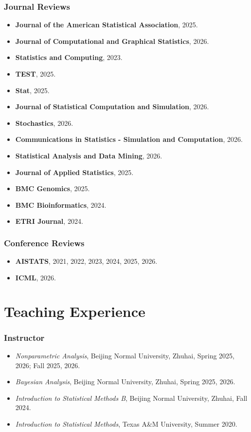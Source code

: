 \documentclass[letterpaper,11pt]{article}
\begin{document}
\subsubsection*{Journal Reviews}
\begin{itemize}[leftmargin=0.15in, label={}]
    \item \textbf{Journal of the American Statistical Association}, 2025.
    \item \textbf{Journal of Computational and Graphical Statistics}, 2026.
    \item \textbf{Statistics and Computing}, 2023.
    \item \textbf{TEST}, 2025.
    \item \textbf{Stat}, 2025.
    \item \textbf{Journal of Statistical Computation and Simulation}, 2026.
    \item \textbf{Stochastics}, 2026.
    \item \textbf{Communications in Statistics - Simulation and Computation}, 2026.
    \item \textbf{Statistical Analysis and Data Mining}, 2026.
    \item \textbf{Journal of Applied Statistics}, 2025.
    \item \textbf{BMC Genomics}, 2025.
    \item \textbf{BMC Bioinformatics}, 2024.
    \item \textbf{ETRI Journal}, 2024.
\end{itemize}

\subsubsection*{Conference Reviews}
\begin{itemize}[leftmargin=0.15in, label={}]
    \item \textbf{AISTATS}, 2021, 2022, 2023, 2024, 2025, 2026.
    \item \textbf{ICML}, 2026.
\end{itemize}

\section{Teaching Experience}
\subsubsection*{Instructor}
\begin{itemize}[leftmargin=0.15in, label={}]
    \item \textit{Nonparametric Analysis}, Beijing Normal University, Zhuhai, Spring 2025, 2026; Fall 2025, 2026.
    \item \textit{Bayesian Analysis}, Beijing Normal University, Zhuhai, Spring 2025, 2026.
    \item \textit{Introduction to Statistical Methods B}, Beijing Normal University, Zhuhai, Fall 2024.
    \item \textit{Introduction to Statistical Methods}, Texas A\&M University, Summer 2020.
\end{itemize}
\end{document}
